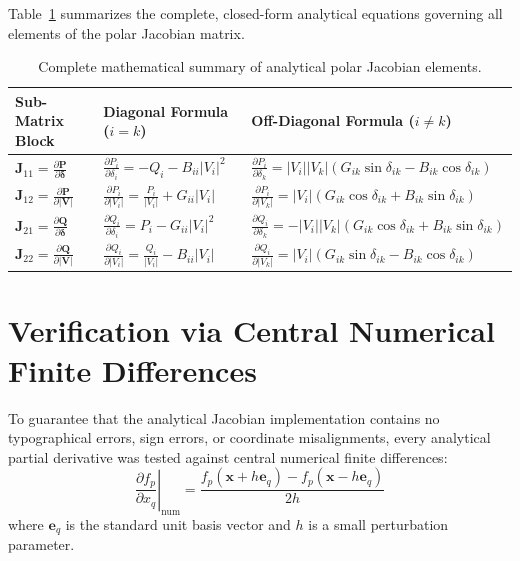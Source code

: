 \documentclass[12pt,a4paper,oneside]{report}
\begin{document}
Table~\ref{tab:jacobian_summary} summarizes the complete, closed-form analytical equations governing all elements of the polar Jacobian matrix.

\begin{table}[htbp]
\centering
\caption{Complete mathematical summary of analytical polar Jacobian elements.}
\label{tab:jacobian_summary}
\small
\begin{tabular}{p{3.2cm}p{6.0cm}p{5.0cm}}
\toprule
\textbf{Sub-Matrix Block} & \textbf{Diagonal Formula ($i = k$)} & \textbf{Off-Diagonal Formula ($i \neq k$)} \\
\midrule
$\mathbf{J}_{11} = \frac{\partial \mathbf{P}}{\partial \boldsymbol{\delta}}$ & $\displaystyle \frac{\partial P_i}{\partial \delta_i} = -Q_i - B_{ii}|V_i|^2$ & $\displaystyle \frac{\partial P_i}{\partial \delta_k} = |V_i||V_k|(G_{ik}\sin\delta_{ik} - B_{ik}\cos\delta_{ik})$ \\
\addlinespace[6pt]
$\mathbf{J}_{12} = \frac{\partial \mathbf{P}}{\partial |\mathbf{V}|}$ & $\displaystyle \frac{\partial P_i}{\partial |V_i|} = \frac{P_i}{|V_i|} + G_{ii}|V_i|$ & $\displaystyle \frac{\partial P_i}{\partial |V_k|} = |V_i|(G_{ik}\cos\delta_{ik} + B_{ik}\sin\delta_{ik})$ \\
\addlinespace[6pt]
$\mathbf{J}_{21} = \frac{\partial \mathbf{Q}}{\partial \boldsymbol{\delta}}$ & $\displaystyle \frac{\partial Q_i}{\partial \delta_i} = P_i - G_{ii}|V_i|^2$ & $\displaystyle \frac{\partial Q_i}{\partial \delta_k} = -|V_i||V_k|(G_{ik}\cos\delta_{ik} + B_{ik}\sin\delta_{ik})$ \\
\addlinespace[6pt]
$\mathbf{J}_{22} = \frac{\partial \mathbf{Q}}{\partial |\mathbf{V}|}$ & $\displaystyle \frac{\partial Q_i}{\partial |V_i|} = \frac{Q_i}{|V_i|} - B_{ii}|V_i|$ & $\displaystyle \frac{\partial Q_i}{\partial |V_k|} = |V_i|(G_{ik}\sin\delta_{ik} - B_{ik}\cos\delta_{ik})$ \\
\bottomrule
\end{tabular}
\end{table}

\section{Verification via Central Numerical Finite Differences}
To guarantee that the analytical Jacobian implementation contains no typographical errors, sign errors, or coordinate misalignments, every analytical partial derivative was tested against central numerical finite differences:
\begin{equation}
\left. \frac{\partial f_p}{\partial x_q} \right|_{\text{num}} = \frac{f_p(\mathbf{x} + h \mathbf{e}_q) - f_p(\mathbf{x} - h \mathbf{e}_q)}{2h}
\end{equation}
where $\mathbf{e}_q$ is the standard unit basis vector and $h$ is a small perturbation parameter.
\end{document}
